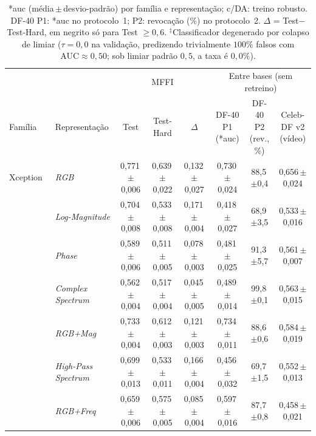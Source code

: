 \documentclass[10pt,conference]{IEEEtran}
\makeatletter
\newcommand{\acr@use}[2]{%
  \@ifundefined{acr@short@#1}{\textbf{??#1??}}{%
    \@ifundefined{acr@used@#1}{%
      \ifnum#2=0 \csname acr@long@#1\endcsname\else\csname acr@longpl@#1\endcsname\fi
      ~(\csname acr@short@#1\endcsname\ifnum#2=1 s\fi)%
      \expandafter\gdef\csname acr@used@#1\endcsname{}%
    }{%
      \csname acr@short@#1\endcsname\ifnum#2=1 s\fi
    }}%
}
\DeclareRobustCommand{\gls}{\@ifstar{\acr@use@s}{\acr@use@s}}
\newcommand{\acr@use@s}[1]{\acr@use{#1}{0}}
\newcommand{\pmsd}[2]{#1\,{\scriptsize$\pm$#2}}
\makeatother
\begin{document}
\begin{table}[!t]
\centering
\caption{\gls*{auc} (média\,$\pm$\,desvio-padrão) por família e representação; c/DA: treino robusto. DF-40 P1: \gls*{auc} no protocolo~1; P2: revocação (\%) no protocolo~2. $\Delta$ = Test$-$Test-Hard, em negrito só para Test $\geq 0{,}6$. $^\ddagger$Classificador degenerado por colapso de limiar ($\tau = 0{,}0$ na validação, predizendo trivialmente $100\%$ falsos com $\text{AUC} \approx 0{,}50$; sob limiar padrão $0{,}5$, a taxa é $0{,}0\%$).}
\label{tab:familias_representacoes}
\vspace{-2mm}
\scriptsize\renewcommand{\arraystretch}{0.88}
\setlength{\tabcolsep}{4pt}
\begin{tabular}{@{}ll ccc ccc@{}}
\toprule
 & & \multicolumn{3}{c}{MFFI} & \multicolumn{3}{c}{Entre bases (sem retreino)} \\
\cmidrule(lr){3-5}\cmidrule(lr){6-8}
Família & Representação & Test & Test-Hard & $\Delta$ & \makecell{DF-40 P1\\(\gls*{auc})} & \makecell{DF-40 P2\\(rev., \%)} & \makecell{Celeb-DF v2\\(vídeo)} \\
\midrule
Xception~\cite{chollet2017xception} & \textit{RGB} & \pmsd{0,771}{0,006} & \pmsd{0,639}{0,022} & \pmsd{0,132}{0,027} & \pmsd{0,730}{0,024} & \pmsd{88,5}{0,4} & \pmsd{0,656}{0,024} \\
 & \textit{Log-Magnitude} & \pmsd{0,704}{0,008} & \pmsd{0,533}{0,008} & \pmsd{0,171}{0,004} & \pmsd{0,418}{0,027} & \pmsd{68,9}{3,5} & \pmsd{0,533}{0,016} \\
 & \textit{Phase} & \pmsd{0,589}{0,006} & \pmsd{0,511}{0,005} & \pmsd{0,078}{0,003} & \pmsd{0,481}{0,025} & \pmsd{91,3}{5,7} & \pmsd{0,561}{0,007} \\
 & \textit{Complex Spectrum} & \pmsd{0,562}{0,004} & \pmsd{0,517}{0,004} & \pmsd{0,045}{0,005} & \pmsd{0,489}{0,014} & \pmsd{99,8}{0,1} & \pmsd{0,563}{0,015} \\
 & \textit{RGB+Mag} & \pmsd{0,733}{0,004} & \pmsd{0,612}{0,003} & \pmsd{0,121}{0,003} & \pmsd{0,734}{0,011} & \pmsd{88,6}{0,6} & \pmsd{0,584}{0,019} \\
 & \textit{High-Pass Spectrum} & \pmsd{0,699}{0,013} & \pmsd{0,533}{0,011} & \pmsd{0,166}{0,004} & \pmsd{0,456}{0,032} & \pmsd{69,7}{1,5} & \pmsd{0,552}{0,013} \\
 & \textit{RGB+Freq} & \pmsd{0,659}{0,006} & \pmsd{0,575}{0,005} & \pmsd{0,085}{0,004} & \pmsd{0,597}{0,016} & \pmsd{87,7}{0,8} & \pmsd{0,458}{0,021} \\

\end{tabular}
\end{table}
\end{document}
